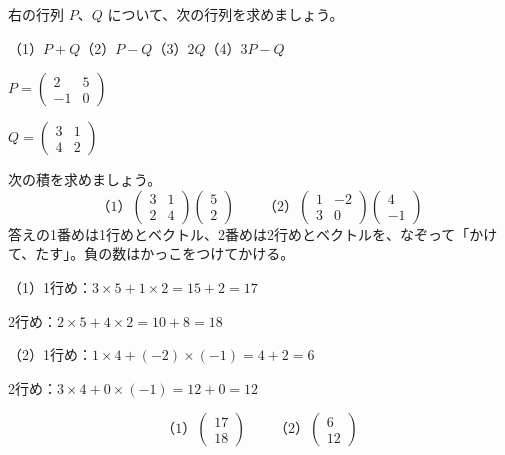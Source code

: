 \begin{jibun}
\noindent\begin{minipage}[c]{0.56\linewidth}\raggedright
右の行列 $P$、$Q$ について、次の行列を求めましょう。\par
（1）$P+Q$\quad （2）$P-Q$\newline （3）$2Q$\quad （4）$3P-Q$
\end{minipage}\hfill
\begin{minipage}[c]{0.42\linewidth}\centering
$P=\begin{pmatrix} 2 & 5\\ -1 & 0 \end{pmatrix}$\par\vspace{2pt}$Q=\begin{pmatrix} 3 & 1\\ 4 & 2 \end{pmatrix}$
\end{minipage}
\end{jibun}

\begin{reidai}[行列×ベクトル]
次の積を求めましょう。
\[ \text{（1）}\begin{pmatrix} 3 & 1\\ 2 & 4 \end{pmatrix}\begin{pmatrix} 5\\ 2 \end{pmatrix}\qquad \text{（2）}\begin{pmatrix} 1 & -2\\ 3 & 0 \end{pmatrix}\begin{pmatrix} 4\\ -1 \end{pmatrix} \]
\kangaekata 答えの1番めは1行めとベクトル、2番めは2行めとベクトルを、なぞって「かけて、たす」。負の数はかっこをつけてかける。\par
\shiki\kviibs{}\zw{} （1）1行め：$3\times5+1\times2=15+2=17$\par
\kviiba \phantom{（1）}2行め：$2\times5+4\times2=10+8=18$\par
\kviiba （2）1行め：$1\times4+(-2)\times(-1)=4+2=6$\par
\kviiba \phantom{（2）}2行め：$3\times4+0\times(-1)=12+0=12$\par
\kotae
\[ \text{（1）}\begin{pmatrix} 17\\ 18 \end{pmatrix}\qquad \text{（2）}\begin{pmatrix} 6\\ 12 \end{pmatrix} \]
\end{reidai}

